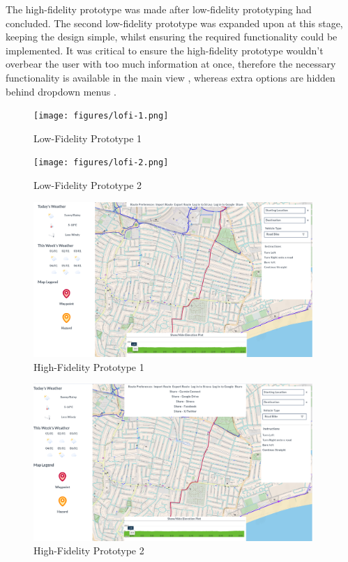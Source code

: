 The high-fidelity prototype was made after low-fidelity prototyping had concluded. The second low-fidelity prototype was expanded upon at this stage, keeping the design simple, whilst ensuring the required functionality could be implemented. It was critical to ensure the high-fidelity prototype wouldn't overbear the user with too much information at once, therefore the necessary functionality is available in the main view , whereas extra options are hidden behind dropdown menus .

  \begin{figure}[!ht]
    \centering
    \texttt{[image: figures/lofi-1.png]}
    \caption{Low-Fidelity Prototype 1}
    \label{fig:lofi1}
  \end{figure}

  \begin{figure}[!ht]
    \centering
    \texttt{[image: figures/lofi-2.png]}
    \caption{Low-Fidelity Prototype 2}
    \label{fig:lofi2}
  \end{figure}

  \begin{figure}[!ht]
    \centering
    \includegraphics[width=400px]{figures/hifi-1.png}
    \caption{High-Fidelity Prototype 1}
    \label{fig:hifi1}
  \end{figure}

  \begin{figure}[!ht]
    \centering
    \includegraphics[width=400px]{figures/hifi-2.png}
    \caption{High-Fidelity Prototype 2}
    \label{fig:hifi2}
  \end{figure}

